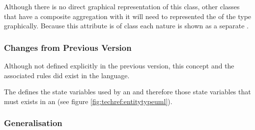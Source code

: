 Although there is no direct graphical representation of this class,
other classes that have a composite aggregation with it will need to
represented the  of the type graphically. Because this
attribute is of class  each nature is shown
as a separate . 





\subsubsection{Changes from Previous Version}

Although not defined explicitly in the previous version, this concept
and the associated rules did exist in the language.

\label{defn:StateVariableDefinition}

The  defines the state variables
used by an  and therefore those state variables
that must exists in an  (see figure
\ref{fig:techref:entitytypeuml}).

\subsubsection{Generalisation}


